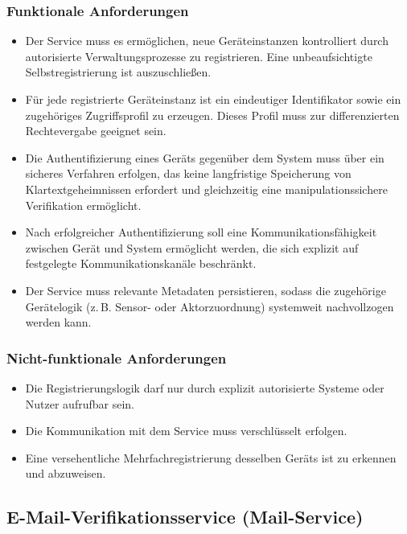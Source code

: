 \subsubsection{Funktionale Anforderungen}
\begin{itemize}
  \item Der Service muss es ermöglichen, neue Geräteinstanzen kontrolliert durch autorisierte Verwaltungsprozesse zu registrieren. Eine unbeaufsichtigte Selbstregistrierung ist auszuschließen.
  
  \item Für jede registrierte Geräteinstanz ist ein eindeutiger Identifikator sowie ein zugehöriges Zugriffsprofil zu erzeugen. Dieses Profil muss zur differenzierten Rechtevergabe geeignet sein.
  
  \item Die Authentifizierung eines Geräts gegenüber dem System muss über ein sicheres Verfahren erfolgen, das keine langfristige Speicherung von Klartextgeheimnissen erfordert und gleichzeitig eine manipulationssichere Verifikation ermöglicht.

  \item Nach erfolgreicher Authentifizierung soll eine Kommunikationsfähigkeit zwischen Gerät und System ermöglicht werden, die sich explizit auf festgelegte Kommunikationskanäle beschränkt.

  \item Der Service muss relevante Metadaten persistieren, sodass die zugehörige Gerätelogik (z.\,B. Sensor- oder Aktorzuordnung) systemweit nachvollzogen werden kann.
\end{itemize}

\subsubsection{Nicht-funktionale Anforderungen}
\begin{itemize}
  \item Die Registrierungslogik darf nur durch explizit autorisierte Systeme oder Nutzer aufrufbar sein.
  \item Die Kommunikation mit dem Service muss verschlüsselt erfolgen.
  \item Eine versehentliche Mehrfachregistrierung desselben Geräts ist zu erkennen und abzuweisen.
\end{itemize}

\subsection{E-Mail-Verifikationsservice (Mail-Service)}

